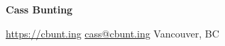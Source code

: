 {\huge\textbf{Cass Bunting}}

\vspace*{2\parskip}

\href{https://cbunt.ing}{https://cbunt.ing}\hfill
\href{mailto:cass@cbunt.ing}{cass@cbunt.ing}\hfill
\phonenumber{\PHONENUM}\hfill
Vancouver, BC

\vspace*{-2\parskip}
